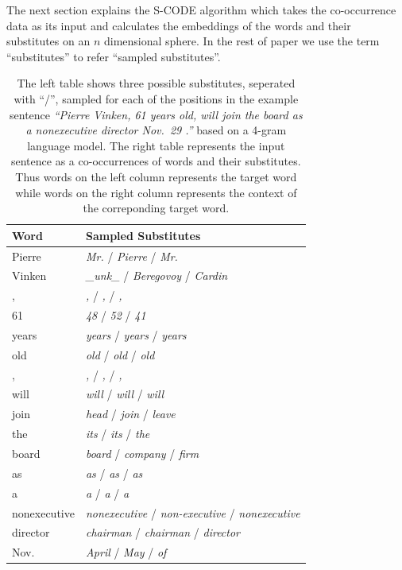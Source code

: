 The next section explains the S-CODE algorithm which takes the
co-occurrence data as its input and calculates the embeddings of the
words and their substitutes on an $n$ dimensional sphere.  In the rest
of paper we use the term ``substitutes'' to refer ``sampled
substitutes''.

\begin{table}[ht]
\caption{The left table shows three possible substitutes, seperated
  with ``/'', sampled for each of the positions in the example
  sentence \textit{``Pierre Vinken, 61 years old, will join the board
    as a nonexecutive director Nov.~29 .''} based on a 4-gram language
  model.  The right table represents the input sentence as a
  co-occurrences of words and their substitutes.  Thus words on the
  left column represents the target word while words on the right
  column represents the context of the correponding target word.}
\begin{tabular}{|ll|} \hline
\textbf{Word} & \textbf{Sampled Substitutes}\\
\hline
Pierre & \textit{Mr.}  / \textit{Pierre} /  \textit{Mr.}\\
Vinken & \textit{\_unk\_} / \textit{Beregovoy} / \textit{Cardin}\\
, & \textit{,} / \textit{,} / \textit{,}\\
61 & \textit{48} / \textit{52} / \textit{41}\\
years & \textit{years} /  \textit{years} /  \textit{years}\\
old & \textit{old} /  \textit{old} /  \textit{old}\\
, & \textit{,} /  \textit{,} /  \textit{,}\\
will & \textit{will} /  \textit{will} /  \textit{will}\\
join & \textit{head} /  \textit{join} /  \textit{leave}\\
the  & \textit{its} /  \textit{its} /  \textit{the}\\
board & \textit{board} /  \textit{company} / \textit{firm}\\
as & \textit{as} / \textit{as} / \textit{as}\\
a & \textit{a} / \textit{a} / \textit{a}\\
nonexecutive & \textit{nonexecutive} / \textit{non-executive} / \textit{nonexecutive}\\
director & \textit{chairman} / \textit{chairman} / \textit{director}\\
Nov. & \textit{April} / \textit{May} / \textit{of}\\

\end{tabular}
\end{table}
